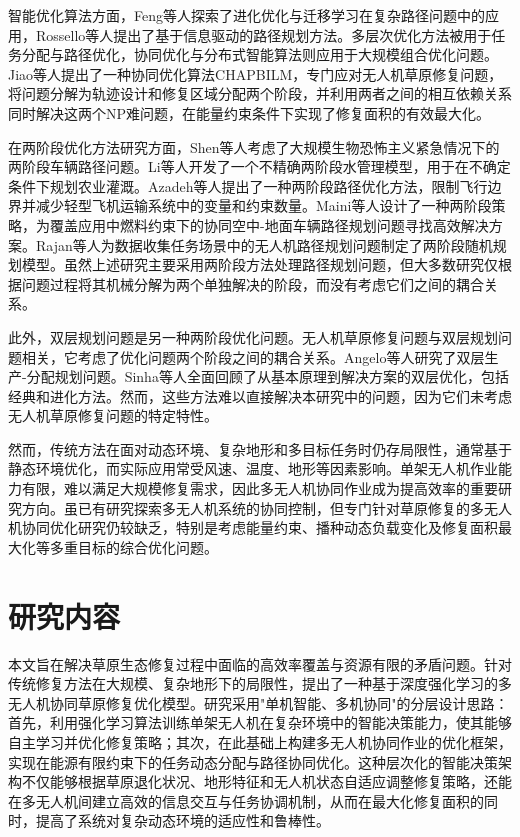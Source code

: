 \documentclass[AutoFakeBold]{LZUThesis}
\begin{document}
智能优化算法方面，Feng等人探索了进化优化与迁移学习在复杂路径问题中的应用\cite{feng2015memes}，Rossello等人提出了基于信息驱动的路径规划方法\cite{rossello2021information}。多层次优化方法被用于任务分配与路径优化\cite{colson2007overview}，协同优化与分布式智能算法则应用于大规模组合优化问题\cite{huang2004cooperative}。Jiao等人\cite{JIAO2024108084}提出了一种协同优化算法CHAPBILM，专门应对无人机草原修复问题，将问题分解为轨迹设计和修复区域分配两个阶段，并利用两者之间的相互依赖关系同时解决这两个NP难问题，在能量约束条件下实现了修复面积的有效最大化。

在两阶段优化方法研究方面，Shen等人\cite{shen2009two}考虑了大规模生物恐怖主义紧急情况下的两阶段车辆路径问题。Li等人\cite{li2010inexact}开发了一个不精确两阶段水管理模型，用于在不确定条件下规划农业灌溉。Azadeh等人\cite{azadeh2019two}提出了一种两阶段路径优化方法，限制飞行边界并减少轻型飞机运输系统中的变量和约束数量。Maini等人\cite{maini2019cooperative}设计了一种两阶段策略，为覆盖应用中燃料约束下的协同空中-地面车辆路径规划问题寻找高效解决方案。Rajan等人\cite{rajan2022routing}为数据收集任务场景中的无人机路径规划问题制定了两阶段随机规划模型。虽然上述研究主要采用两阶段方法处理路径规划问题，但大多数研究仅根据问题过程将其机械分解为两个单独解决的阶段，而没有考虑它们之间的耦合关系。

此外，双层规划问题\cite{colson2007overview}是另一种两阶段优化问题。无人机草原修复问题与双层规划问题相关，它考虑了优化问题两个阶段之间的耦合关系。Angelo等人\cite{angelo2015study}研究了双层生产-分配规划问题。Sinha等人\cite{sinha2017review}全面回顾了从基本原理到解决方案的双层优化，包括经典和进化方法。然而，这些方法难以直接解决本研究中的问题，因为它们未考虑无人机草原修复问题的特定特性。

然而，传统方法在面对动态环境、复杂地形和多目标任务时仍存局限性\cite{gann2019international}，通常基于静态环境优化，而实际应用常受风速、温度、地形等因素影响\cite{blackburn2021monitoring}。单架无人机作业能力有限，难以满足大规模修复需求，因此多无人机协同作业成为提高效率的重要研究方向\cite{dorling2016vehicle,maini2019cooperative}。虽已有研究探索多无人机系统的协同控制\cite{buters2019seed}，但专门针对草原修复的多无人机协同优化研究仍较缺乏，特别是考虑能量约束、播种动态负载变化及修复面积最大化等多重目标的综合优化问题。

\section{研究内容}
本文旨在解决草原生态修复过程中面临的高效率覆盖与资源有限的矛盾问题。针对传统修复方法在大规模、复杂地形下的局限性，提出了一种基于深度强化学习的多无人机协同草原修复优化模型。研究采用"单机智能、多机协同"的分层设计思路：首先，利用强化学习算法训练单架无人机在复杂环境中的智能决策能力，使其能够自主学习并优化修复策略；其次，在此基础上构建多无人机协同作业的优化框架，实现在能源有限约束下的任务动态分配与路径协同优化。这种层次化的智能决策架构不仅能够根据草原退化状况、地形特征和无人机状态自适应调整修复策略，还能在多无人机间建立高效的信息交互与任务协调机制，从而在最大化修复面积的同时，提高了系统对复杂动态环境的适应性和鲁棒性。
\end{document}
